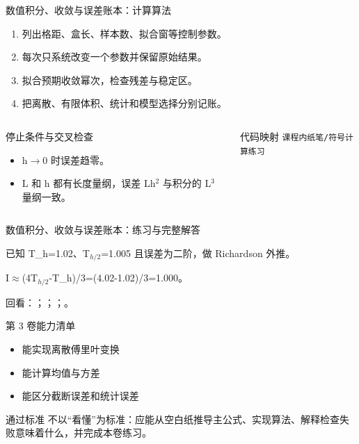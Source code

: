 \begin{frame}[t]{数值积分、收敛与误差账本：计算算法}
\footnotesize
{}\begin{enumerate}
\item 列出格距、盒长、样本数、拟合窗等控制参数。
\item 每次只系统改变一个参数并保留原始结果。
\item 拟合预期收敛幂次，检查残差与稳定区。
\item 把离散、有限体积、统计和模型选择分别记账。
\end{enumerate}\begin{columns}[T,onlytextwidth]
\begin{block}{停止条件与交叉检查}\scriptsize\begin{itemize}
\item[\CheckMark] h\ensuremath{\rightarrow}0 时误差趋零。
\item[\CheckMark] L 和 h 都有长度量纲，误差 Lh\ensuremath{^{2}} 与积分的 L\ensuremath{^{3}} 量纲一致。
\end{itemize}\end{block}
\begin{block}{代码映射}
\scriptsize \texttt{课程内纸笔/\allowbreak{}符号计算练习}
\end{block}\end{columns}\end{frame}

\begin{frame}[t]{数值积分、收敛与误差账本：练习与完整解答}
\footnotesize
\begin{block}{}已知 T\_h=1.02、T\ensuremath{_{h/2}}=1.005 且误差为二阶，做 Richardson 外推。\end{block}
\begin{exampleblock}{}I\ensuremath{\approx}(4T\ensuremath{_{h/2}}-T\_h)/\allowbreak{}3=(4.02-1.02)/\allowbreak{}3=1.000。\end{exampleblock}
\vfill
\scriptsize 回看：；；；。
\end{frame}

\begin{frame}[t]{第 3 卷能力清单}
\small\begin{itemize}
\item[\CheckMark] 能实现离散傅里叶变换
\item[\CheckMark] 能计算均值与方差
\item[\CheckMark] 能区分截断误差和统计误差
\end{itemize}\vfill\begin{block}{通过标准}
不以“看懂”为标准：应能从空白纸推导主公式、实现算法、解释检查失败意味着什么，并完成本卷练习。
\end{block}\end{frame}

